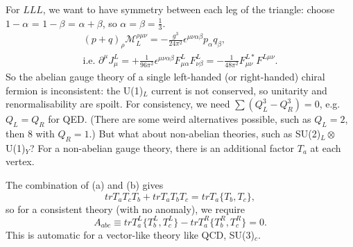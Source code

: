 For $LLL$, we want to have symmetry between each leg of the triangle: choose $1-\alpha$ = $1-\beta$ = $\alpha + \beta$, so $\alpha=\beta=\frac{1}{3}$.
\begin{equation}
\begin{split}
(p+q)_\rho \mathcal{M}_L^{\rho \mu \nu} = - \frac{g^3}{24\pi^2} \epsilon^{\mu \nu \alpha \beta} p_\alpha q_\beta, \\
\text{i.e. } \partial^\mu J_\mu^L = + \frac{1}{96\pi^2}\epsilon^{\mu \nu \alpha \beta}F_{\mu \alpha}^L F_{\nu \beta}^L = - \frac{1}{48 \pi^2}F_{\mu \nu}^{L *} F^{L \mu \nu}.
\end{split}
\end{equation}
So the abelian gauge theory of a single left-handed (or right-handed) chiral fermion is inconsistent: the U(1)$_L$ current is not conserved, so unitarity and renormalisability are spoilt. For consistency, we need $\sum (Q_L^3 - Q_R^3)=0$, e.g. $Q_L=Q_R$ for QED. (There are some weird alternatives possible, such as $Q_L=2$, then 8  with $Q_R=1$.) But what about non-abelian theories, such as SU(2)$_L \otimes$U(1)$_Y$? For a non-abelian gauge theory, there is an additional factor $T_a$ at each vertex.
\begin{figure}[!h]
\end{figure}
The combination of (a) and (b) gives
\begin{equation}
trT_aT_cT_b + trT_aT_bT_c = trT_a\{T_b,T_c\},
\end{equation}
so for a consistent theory (with no anomaly), we require
\begin{equation}
A_{abc} \equiv trT_a^L\{T_b^L,T_c^L\} - trT_a^R\{T_b^R,T_c^R\} = 0.
\end{equation}
This is automatic for a vector-like theory like QCD, SU(3)$_c$.
%
